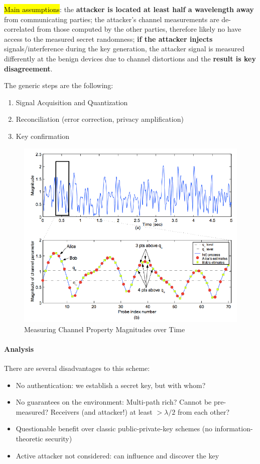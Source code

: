 \hl{Main assumptions}: the \textbf{attacker is located at least half a wavelength away} from communicating parties; the attacker's channel measurements are de-correlated from those computed by the other parties, therefore likely no have access to the measured secret randomness; \textbf{if the attacker injects} signals/interference during the key generation, the attacker signal is measured differently at the benign devices due to channel distortions and the \textbf{result is key disagreement}.

The generic steps are the following:
\begin{enumerate}
	\item Signal Acquisition and Quantization
	\item Reconciliation (error correction, privacy amplification)
	\item Key confirmation
\end{enumerate}

\begin{figure}[h]
	\centering
	\includegraphics[scale=0.5]{images/7-channel-property.png}
	\caption{Measuring Channel Property Magnitudes over Time}%
	\label{fig:channel-property}
\end{figure}

\paragraph{Analysis}
There are several disadvantages to this scheme:
\begin{itemize}
	\item No authentication: we establish a secret key, but with whom?
	\item No guarantees on the environment:
	      Multi-path rich? Cannot be pre-measured? Receivers (and attacker!) at least $> \lambda / 2$ from each other?
	\item Questionable benefit over classic public-private-key schemes (no information-theoretic security)
	\item Active attacker not considered: can influence and discover the key
\end{itemize}

